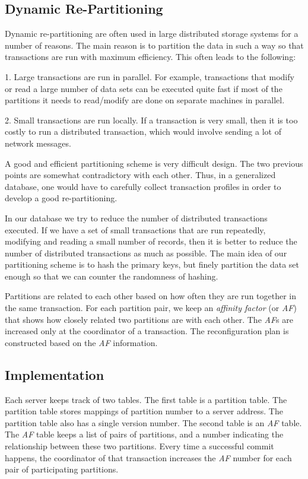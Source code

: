 \documentclass[a4paper, 10pt, notitlepage]{article}
\begin{document}
\subsection{Dynamic Re-Partitioning}

Dynamic re-partitioning are often used in large distributed storage systems for a number of reasons. The main reason is
to partition the data in such a way so that transactions are run with maximum efficiency. This often leads to the following:

1. Large transactions are run in parallel. For example, transactions that modify or read a large number of data sets
can be executed quite fast if most of the partitions it needs to read/modify are done on separate machines in parallel.

2. Small transactions are run locally. If a transaction is very small, then it is too costly to run a distributed transaction,
which would involve sending a lot of network messages. 

A good and efficient partitioning scheme is very difficult design. The two previous points are somewhat contradictory with each
other. Thus, in a generalized database, one would have to carefully collect transaction profiles in order to develop a good
re-partitioning.

In our database we try to reduce the number of distributed transactions executed. If we have a set of small transactions that are 
run repeatedly, modifying and reading a small number of records, then it is better to reduce the number of distributed transactions 
as much as possible. The main idea of our partitioning scheme is to hash the primary keys, but finely partition the data set enough 
so that we can counter the randomness of hashing. 

Partitions are related to each other based on how often they are run together in the same transaction. For each partition pair, we
keep an {\em affinity factor} (or {\em AF}) that shows how closely related two partitions are with each other. The {\em AF}s are
increased only at the coordinator of a transaction. The reconfiguration plan is constructed based on the {\em AF} information.

\subsection{Implementation}

Each server keeps track of two tables. The first table is a partition table. The partition table stores mappings of partition number
to a server address. The partition table also has a single version number. The second table is an {\em AF} table.
The {\em AF} table keeps a list of pairs of partitions, and a number indicating the relationship between these two partitions.
Every time a successful commit happens, the coordinator of that transaction increases the {\em AF} number for each pair of participating
partitions. 
\end{document}
